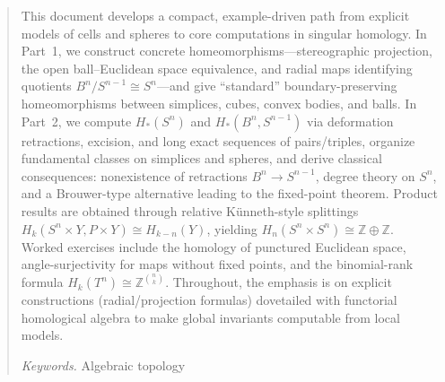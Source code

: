 \begin{abstract}
This document develops a compact, example-driven path from explicit models of cells and spheres to core computations in singular homology. In Part~1, we construct concrete homeomorphisms—stereographic projection, the open ball–Euclidean space equivalence, and radial maps identifying quotients \(B^n/S^{n-1}\cong S^n\)—and give “standard” boundary-preserving homeomorphisms between simplices, cubes, convex bodies, and balls. In Part~2, we compute \(H_\ast(S^n)\) and \(H_\ast(B^n, S^{n-1})\) via deformation retractions, excision, and long exact sequences of pairs/triples, organize fundamental classes on simplices and spheres, and derive classical consequences: nonexistence of retractions \(B^n\to S^{n-1}\), degree theory on \(S^n\), and a Brouwer-type alternative leading to the fixed-point theorem. Product results are obtained through relative Künneth-style splittings \(H_k(S^n\times Y, P\times Y)\cong H_{k-n}(Y)\), yielding \(H_n(S^n\times S^n)\cong \mathbb{Z}\oplus\mathbb{Z}\). Worked exercises include the homology of punctured Euclidean space, angle-surjectivity for maps without fixed points, and the binomial-rank formula \(H_k(T^n)\cong \mathbb{Z}^{\binom{n}{k}}\). Throughout, the emphasis is on explicit constructions (radial/projection formulas) dovetailed with functorial homological algebra to make global invariants computable from local models.

\textit{Keywords.} Algebraic topology
\end{abstract}
